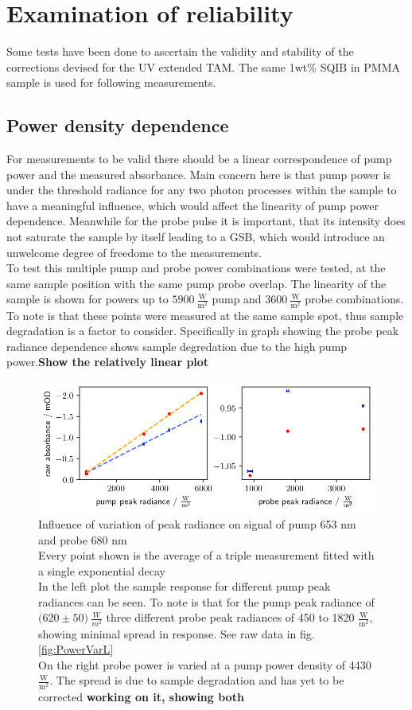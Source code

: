 \documentclass[twoside,openright]{scrreprt}
\begin{document}
\chapter{Examination of reliability}
Some tests have been done to ascertain the validity and stability of the corrections devised for the UV extended TAM. The same 1wt\% SQIB in PMMA sample is used for following measurements.
\section{Power density dependence}\label{sec:powerVar}
For measurements to be valid there should be a linear correspondence of pump power and the measured absorbance. Main concern here is that pump power is under the threshold radiance for any two photon processes within the sample to have a meaningful influence, which would affect the linearity of pump power dependence. Meanwhile for the probe pulse it is important, that its intensity does not saturate the sample by itself leading to a GSB, which would introduce an unwelcome degree of freedome to the measurements.\\
To test this multiple pump and probe power combinations were tested, at the same sample position with the same pump probe overlap. The linearity of the sample is shown for powers up to $\mathrm{5900\ \frac{W}{m^2}}$ pump and $\mathrm{3600 \ \frac{W}{m^2}}$ probe combinations. To note is that these points were measured at the same sample spot, thus sample degradation is a factor to consider. Specifically in graph showing the probe peak radiance dependence shows sample degredation due to the high pump power.\textbf{Show the relatively linear plot}

\begin{figure}[hbtp]
\centering
\includegraphics[width=\linewidth]{images/PowerVariationNotCorrected.png}
\caption{Influence of variation of peak radiance on signal of pump 653 nm and probe 680 nm\\
Every point shown is the average of a triple measurement fitted with a single exponential decay\\
In the left plot the sample response for different pump peak radiances can be seen. To note is that for the pump peak radiance of $\mathrm{(620 \pm 50})\ \frac{W}{m^2}$ three different probe peak radiances of 450 to 1820 $\mathrm{\frac{W}{m^2}}$, showing minimal spread in response. See raw data in fig. \ref{fig:PowerVarL}\\
On the right probe power is varied at a pump power density of 4430 $\mathrm{\frac{W}{m^2}}$. The spread is due to sample degradation and has yet to be corrected \textbf{working on it, showing both}}
\end{figure}
\end{document}
